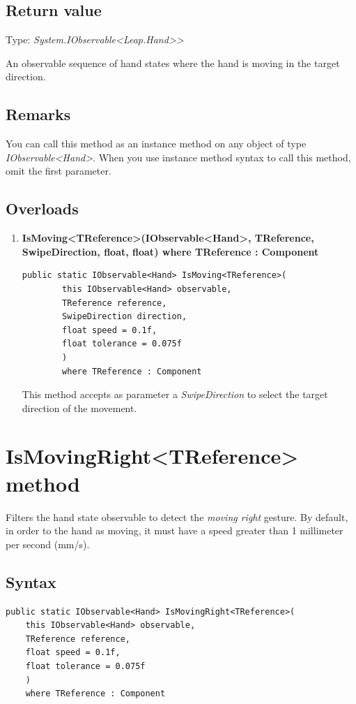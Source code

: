 \documentclass[12pt,a4paper,twoside]{report}
\begin{document}
\subsection{Return value}
Type: \textit{System.IObservable<Leap.Hand>{}>}

An observable sequence of hand states where the hand is moving in the target direction.

\subsection{Remarks}
You can call this method as an instance method on any object of type \textit{IObservable<Hand>}. When you use instance method syntax to call this method, omit the first parameter.

\subsection{Overloads}
\begin{enumerate}
    \item \textbf{IsMoving<TReference>(IObservable<Hand>, TReference, SwipeDirection, float, float) where TReference : Component}
\begin{lstlisting}[caption=Declaration]
     public static IObservable<Hand> IsMoving<TReference>(
        this IObservable<Hand> observable,
        TReference reference,
        SwipeDirection direction,
        float speed = 0.1f,
        float tolerance = 0.075f
        ) 
        where TReference : Component
\end{lstlisting}
    This method accepts as parameter a \textit{SwipeDirection} to select the target direction of the movement.
\end{enumerate}

\section{IsMovingRight<TReference> method}
Filters the hand state observable to detect the \textit{moving right} gesture. By default, in order to the hand as moving, it must have a speed greater than 1 millimeter per second (mm/s).

\subsection{Syntax}
\begin{lstlisting}[caption=Declaration]
  public static IObservable<Hand> IsMovingRight<TReference>(
    this IObservable<Hand> observable,
    TReference reference,
    float speed = 0.1f,
    float tolerance = 0.075f
    )
    where TReference : Component
\end{lstlisting}
\end{document}
